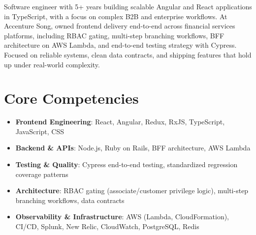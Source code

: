 \documentclass[11pt,a4paper,sans]{moderncv}
\begin{document}
\makecvtitle


\vspace{6pt}
\small{Software engineer with 5+ years building scalable Angular and React applications in TypeScript, with a focus on complex B2B and enterprise workflows. At Accenture Song, owned frontend delivery end-to-end across financial services platforms, including RBAC gating, multi-step branching workflows, BFF architecture on AWS Lambda, and end-to-end testing strategy with Cypress. Focused on reliable systems, clean data contracts, and shipping features that hold up under real-world complexity.}


\section{Core Competencies}
\vspace{1pt}
\begin{itemize}

\item \textbf{Frontend Engineering}: React, Angular, Redux, RxJS, TypeScript, JavaScript, CSS

\item \textbf{Backend \& APIs}: Node.js, Ruby on Rails, BFF architecture, AWS Lambda

\item \textbf{Testing \& Quality}: Cypress end-to-end testing, standardized regression coverage patterns

\item \textbf{Architecture}: RBAC gating (associate/customer privilege logic), multi-step branching workflows, data contracts

\item \textbf{Observability \& Infrastructure}: AWS (Lambda, CloudFormation), CI/CD, Splunk, New Relic, CloudWatch, PostgreSQL, Redis

\end{itemize}

\end{document}
